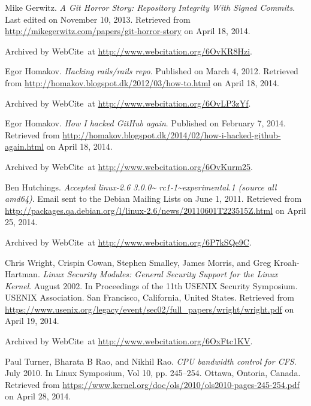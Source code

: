 \begin{thebibliography}{9}
Mike Gerwitz. \emph{A Git Horror Story: Repository Integrity With Signed
Commits}. Last edited on November 10, 2013. Retrieved from
\url{http://mikegerwitz.com/papers/git-horror-story} on April 18, 2014.

Archived by WebCite\textsuperscript{\textregistered}\ at
\url{http://www.webcitation.org/6OvKR8Hzi}.


Egor Homakov. \emph{Hacking rails/rails repo}. Published on March 4, 2012.
Retrieved from \url{http://homakov.blogspot.dk/2012/03/how-to.html} on April
18, 2014.

Archived by WebCite\textsuperscript{\textregistered}\ at
\url{http://www.webcitation.org/6OvLP3zYf}.


Egor Homakov. \emph{How I hacked GitHub again}. Published on February 7, 2014.
Retrieved from
\url{http://homakov.blogspot.dk/2014/02/how-i-hacked-github-again.html} on
April 18, 2014.

Archived by WebCite\textsuperscript{\textregistered}\ at
\url{http://www.webcitation.org/6OvKurm25}.


Ben Hutchings. \emph{Accepted linux-2.6 3.0.0\textasciitilde
rc1-1\textasciitilde experimental.1 (source all amd64)}. Email sent to the
Debian Mailing Lists on June 1, 2011.  Retrieved from
\url{http://packages.qa.debian.org/l/linux-2.6/news/20110601T223515Z.html} on
April 25, 2014.

Archived by WebCite\textsuperscript{\textregistered}\ at
\url{http://www.webcitation.org/6P7kSQe9C}.


Chris Wright, Crispin Cowan, Stephen Smalley, James Morris, and Greg
Kroah-Hartman. \emph{Linux Security Modules: General Security Support for the
Linux Kernel}. August 2002. In Proceedings of the 11th USENIX Security
Symposium. USENIX Association. San Francisco, California, United States.
Retrieved from
\url{https://www.usenix.org/legacy/event/sec02/full_papers/wright/wright.pdf}
on April 19, 2014.

Archived by WebCite\textsuperscript{\textregistered}\ at
\url{http://www.webcitation.org/6OxFtc1KV}.


Paul Turner, Bharata B Rao, and Nikhil Rao. \emph{CPU bandwidth control for
CFS}. July 2010. In Linux Symposium, Vol 10, pp. 245--254. Ottawa, Ontoria,
Canada. Retrieved from
\url{https://www.kernel.org/doc/ols/2010/ols2010-pages-245-254.pdf} on April
28, 2014.


\end{thebibliography}
